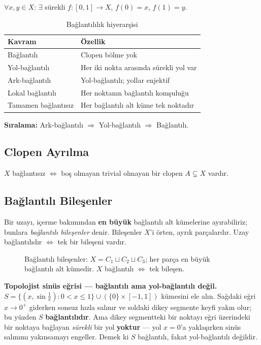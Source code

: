 \begin{definition}
$\forall x,y \in X$: $\exists$ sürekli $f:[0,1] \to X$, $f(0) = x$, $f(1) = y$.
\end{definition}

\begin{table}[h]
\centering
\begin{tabular}{ll}
\toprule
\textbf{Kavram} & \textbf{Özellik} \\
\midrule
Bağlantılı & Clopen bölme yok \\
Yol-bağlantılı & Her iki nokta arasında sürekli yol var \\
Ark-bağlantılı & Yol-bağlantılı; yollar enjektif \\
Lokal bağlantılı & Her noktanın bağlantılı komşuluğu \\
Tamamen bağlantısız & Her bağlantılı alt küme tek noktadır \\
\bottomrule
\end{tabular}
\caption{Bağlantılılık hiyerarşisi}
\end{table}

\textbf{Sıralama:} Ark-bağlantılı $\Rightarrow$ Yol-bağlantılı $\Rightarrow$ Bağlantılı.

\subsection{Clopen Ayrılma}

$X$ bağlantısız $\Leftrightarrow$ boş olmayan trivial olmayan bir clopen $A \subsetneq X$ vardır.

\subsection{Bağlantılı Bileşenler}

Bir uzayı, içerme bakımından \textbf{en büyük} bağlantılı alt kümelerine
ayırabiliriz; bunlara \emph{bağlantılı bileşenler} denir. Bileşenler $X$'i örten,
ayrık parçalardır. Uzay bağlantılıdır $\Leftrightarrow$ tek bir bileşeni vardır.

\begin{figure}[ht]
  \centering
  
  \caption{Bağlantılı bileşenler: $X = C_1 \sqcup C_2 \sqcup C_3$; her parça en
    büyük bağlantılı alt kümedir. $X$ bağlantılı $\iff$ tek bileşen.}
\end{figure}

\begin{karsiornek}
\textbf{Topolojist sinüs eğrisi — bağlantılı ama yol-bağlantılı değil.}
$S = \{(x, \sin\tfrac{1}{x}) : 0 < x \le 1\} \cup (\{0\}\times[-1,1])$ kümesini
ele alın. Sağdaki eğri $x \to 0^+$ giderken sonsuz hızla salınır ve soldaki dikey
segmente keyfi yakın olur; bu yüzden $S$ \textbf{bağlantılıdır}. Ama dikey
segmentteki bir noktayı eğri üzerindeki bir noktaya bağlayan \emph{sürekli} bir
yol \textbf{yoktur} --- yol $x=0$'a yaklaşırken sinüs salınımı yakınsamayı
engeller. Demek ki $S$ bağlantılı, fakat yol-bağlantılı değildir.
\end{karsiornek}

